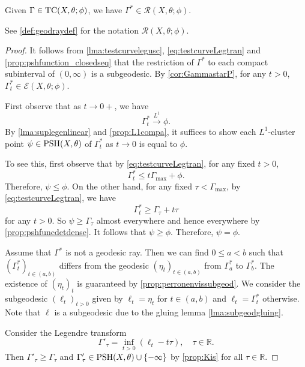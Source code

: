 \begin{lemma}\label{lma:LegsendsTCtoR}
    Given $\Gamma\in \mathrm{TC}(X,\theta;\phi)$, we have $\Gamma^*\in \mathcal{R}(X,\theta;\phi)$.
\end{lemma}
See \cref{def:geodraydef} for the notation $\mathcal{R}(X,\theta;\phi)$.
\begin{proof}
    It follows from \cref{lma:testcurvelegusc}, \eqref{eq:testcurveLegtran} and \cref{prop:pshfunction_closedseq} that the restriction of $\Gamma^*$ to each compact subinterval of $(0,\infty)$ is a subgeodesic. By \cref{cor:GammastarP}, for any $t>0$, $\Gamma^*_t\in \mathcal{E}(X,\theta;\phi)$.

    First observe that as $t\to 0+$, we have
    \begin{equation}\label{eq:GammatophiL1temp}
        \Gamma_t^*\xrightarrow{L^1}\phi.
    \end{equation}
    By \cref{lma:suplegenlinear} and \cref{prop:L1compa}, it suffices to show each $L^1$-cluster point $\psi\in \mathrm{PSH}(X,\theta)$ of $\Gamma_t^*$ as $t\to 0$ is equal to $\phi$.

    To see this, first observe that by \eqref{eq:testcurveLegtran}, for any fixed $t>0$,
    \[
        \Gamma_t^*\leq t\Gamma_{\max}+\phi.
    \]
    Therefore, $\psi\leq \phi$. On the other hand, for any fixed $\tau<\Gamma_{\max}$, by \eqref{eq:testcurveLegtran}, we have
    \[
        \Gamma^*_t\geq \Gamma_{\tau}+t\tau
    \]
    for any $t>0$. So $\psi\geq \Gamma_{\tau}$ almost everywhere and hence everywhere by \cref{prop:pshfuncdetdense}. It follows that $\psi\geq \phi$. Therefore, $\psi=\phi$.

     Assume that $\Gamma^*$ is not a geodesic ray. Then we can find $0\leq a<b$ such that $(\Gamma^*_t)_{t\in (a,b)}$ differs from the geodesic $(\eta_t)_{t\in (a,b)}$ from $\Gamma^*_a$ to $\Gamma^*_b$. The existence of $(\eta_t)_t$ is guaranteed by \cref{prop:perronenvissubgeod}.
     We consider the subgeodesic $(\ell_t)_{t>0}$ given by $\ell_t=\eta_t$ for $t\in (a,b)$ and $\ell_t=\Gamma^*_t$ otherwise. Note that $\ell$ is a subgeodesic due to the gluing lemma \cref{lma:subgeodgluing}.

     Consider the Legendre transform
    \[
        \Gamma'_{\tau}=\inf_{t>0} (\ell_t-t\tau),\quad \tau\in \mathbb{R}.
    \]
    Then $\Gamma'_{\tau}\geq \Gamma_{\tau}$ and $\Gamma'_{\tau}\in \mathrm{PSH}(X,\theta)\cup\{-\infty\}$ by \cref{prop:Kis} for all $\tau\in \mathbb{R}$.


\end{proof}
